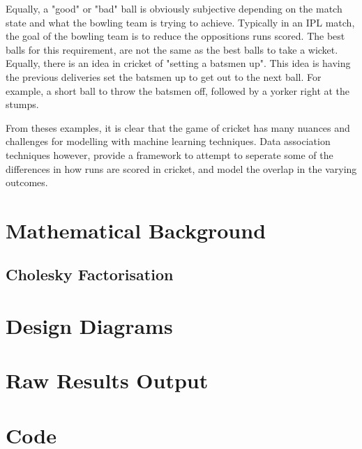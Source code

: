 \documentclass[12pt,a4paper]{report}
\theoremstyle{definition}
\begin{document}
Equally, a "good" or "bad" ball is obviously subjective depending on the match state and what the bowling team is trying to achieve. 
Typically in an IPL match, the goal of the bowling team is to reduce the oppositions runs scored. 
The best balls for this requirement, are not the same as the best balls to take a wicket. 
Equally, there is an idea in cricket of "setting a batsmen up". 
This idea is having the previous deliveries set the batsmen up to get out to the next ball. 
For example, a short ball to throw the batsmen off, followed by a yorker right at the stumps. 

From theses examples, it is clear that the game of cricket has many nuances and challenges for modelling with machine learning techniques. 
Data association techniques however, provide a framework to attempt to seperate some of the differences in how runs are scored in cricket, and model the overlap in the varying outcomes.

\chapter{Mathematical Background}

\section{Cholesky Factorisation} \label{sec:CholFac}

\chapter{Design Diagrams}

\chapter{Raw Results Output}

\chapter{Code}
\end{document}
